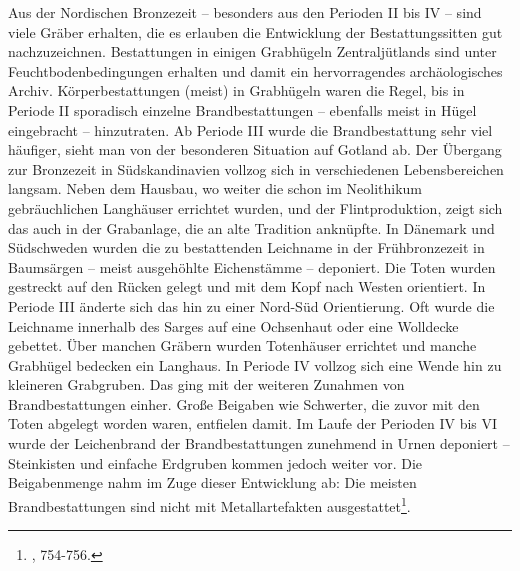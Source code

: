 \documentclass[openany,twoside,twocolumn]{book}
\let\rmarkdownfootnote\footnote%
\def\footnote{\protect\rmarkdownfootnote}
\begin{document}
Aus der Nordischen Bronzezeit -- besonders aus den Perioden II bis IV -- sind viele Gräber erhalten, die es erlauben die Entwicklung der Bestattungssitten gut nachzuzeichnen. Bestattungen in einigen Grabhügeln Zentraljütlands sind unter Feuchtbodenbedingungen erhalten und damit ein hervorragendes archäologisches Archiv. Körperbestattungen (meist) in Grabhügeln waren die Regel, bis in Periode II sporadisch einzelne Brandbestattungen -- ebenfalls meist in Hügel eingebracht -- hinzutraten. Ab Periode III wurde die Brandbestattung sehr viel häufiger, sieht man von der besonderen Situation auf Gotland ab. Der Übergang zur Bronzezeit in Südskandinavien vollzog sich in verschiedenen Lebensbereichen langsam. Neben dem Hausbau, wo weiter die schon im Neolithikum gebräuchlichen Langhäuser errichtet wurden, und der Flintproduktion, zeigt sich das auch in der Grabanlage, die an alte Tradition anknüpfte. In Dänemark und Südschweden wurden die zu bestattenden Leichname in der Frühbronzezeit in Baumsärgen -- meist ausgehöhlte Eichenstämme -- deponiert. Die Toten wurden gestreckt auf den Rücken gelegt und mit dem Kopf nach Westen orientiert. In Periode III änderte sich das hin zu einer Nord-Süd Orientierung. Oft wurde die Leichname innerhalb des Sarges auf eine Ochsenhaut oder eine Wolldecke gebettet. Über manchen Gräbern wurden Totenhäuser errichtet und manche Grabhügel bedecken ein Langhaus. In Periode IV vollzog sich eine Wende hin zu kleineren Grabgruben. Das ging mit der weiteren Zunahmen von Brandbestattungen einher. Große Beigaben wie Schwerter, die zuvor mit den Toten abgelegt worden waren, entfielen damit. Im Laufe der Perioden IV bis VI wurde der Leichenbrand der Brandbestattungen zunehmend in Urnen deponiert -- Steinkisten und einfache Erdgruben kommen jedoch weiter vor. Die Beigabenmenge nahm im Zuge dieser Entwicklung ab: Die meisten Brandbestattungen sind nicht mit Metallartefakten ausgestattet\footnote{\textcite{thrane_scandinavia_2013}, 754-756.}.
\end{document}

